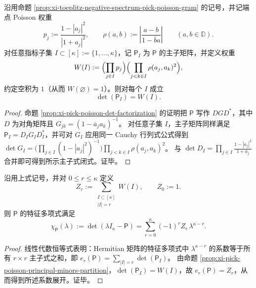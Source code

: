 \begin{proposition}\label{prop:xi-pick-poisson-principal-minors-partition}
沿用命题 \ref{prop:xi-toeplitz-negative-spectrum-pick-poisson-gram} 的记号，并记端点 Poisson 权重
\[
p_j:=\frac{1-|a_j|^2}{|1+a_j|^2},
\qquad
\rho(a,b):=\left|\frac{a-b}{1-\overline b a}\right|\qquad(a,b\in\mathbb D).
\]
对任意指标子集 \(I\subset[\kappa]:=\{1,\dots,\kappa\}\)，记 \(\mathsf P_I\) 为 \(\mathsf P\) 的主子矩阵，并定义权重
\[
W(I):=\Bigl(\prod_{j\in I}p_j\Bigr)\Bigl(\prod_{j<k\in I}\rho(a_j,a_k)^2\Bigr),
\]
约定空积为 \(1\)（从而 \(W(\varnothing)=1\)）。则对每个 \(I\) 成立
\[
\boxed{\;\det(\mathsf P_I)=W(I).\;}
\]
\end{proposition}
\begin{proof}
命题 \ref{prop:xi-pick-poisson-det-factorization} 的证明把 \(\mathsf P\) 写作 \(DGD^\ast\)，其中 \(D\) 为对角矩阵且 \(G_{jk}=(1-\overline a_j a_k)^{-1}\)。
对任意子集 \(I\)，主子矩阵同样满足 \(\mathsf P_I=D_I G_I D_I^\ast\)，并可对 \(G_I\) 应用同一 Cauchy 行列式公式得到
\(
\det G_I=\bigl(\prod_{j\in I}(1-|a_j|^2)^{-1}\bigr)\prod_{j<k\in I}\rho(a_j,a_k)^2
\)。
与 \(\det D_I=\prod_{j\in I}\frac{1-|a_j|^2}{1+\overline a_j}\) 合并即可得到所示主子式闭式。证毕。
\end{proof}

\begin{proposition}\label{prop:xi-pick-poisson-charpoly-coefficients}
沿用上式记号，并对 \(0\le r\le\kappa\) 定义
\[
Z_r:=\sum_{\substack{I\subset[\kappa]\\|I|=r}}W(I),\qquad Z_0:=1.
\]
则 \(\mathsf P\) 的特征多项式满足
\[
\boxed{\;
\chi_{\mathsf P}(\lambda):=\det(\lambda I_\kappa-\mathsf P)
=\sum_{r=0}^{\kappa}(-1)^r Z_r\,\lambda^{\kappa-r}.\;}
\]
\end{proposition}
\begin{proof}
线性代数恒等式表明：Hermitian 矩阵的特征多项式中 \(\lambda^{\kappa-r}\) 的系数等于所有 \(r\times r\) 主子式之和，即
\(
e_r(\mathsf P)=\sum_{|I|=r}\det(\mathsf P_I)
\)。
由命题 \ref{prop:xi-pick-poisson-principal-minors-partition}，\(\det(\mathsf P_I)=W(I)\)，故 \(e_r(\mathsf P)=Z_r\)，从而得到所述系数展开。证毕。
\end{proof}

